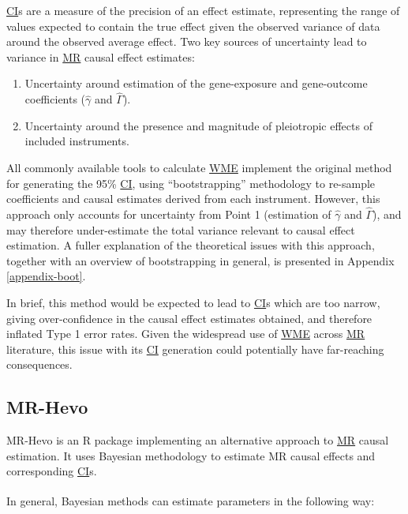 \documentclass[
]{article}
\begin{document}
\hyperref[acronyms_CI]{CI}s are a measure of the precision of an effect estimate, representing the range of values expected to contain the true effect given the observed variance of data around the observed average effect. Two key sources of uncertainty lead to variance in \hyperref[acronyms_MR]{MR} causal effect estimates:

\begin{enumerate}
\def\labelenumi{\arabic{enumi}.}
\item
  Uncertainty around estimation of the gene-exposure and gene-outcome coefficients (\(\hat{\gamma}\) and \(\hat{\Gamma}\)).
\item
  Uncertainty around the presence and magnitude of pleiotropic effects of included instruments.
\end{enumerate}

All commonly available tools to calculate \hyperref[acronyms_WME]{WME} implement the original method for generating the 95\% \hyperref[acronyms_CI]{CI}, using ``bootstrapping'' methodology to re-sample coefficients and causal estimates derived from each instrument. However, this approach only accounts for uncertainty from Point 1 (estimation of \(\hat{\gamma}\) and \(\hat{\Gamma}\)), and may therefore under-estimate the total variance relevant to causal effect estimation. A fuller explanation of the theoretical issues with this approach, together with an overview of bootstrapping in general, is presented in Appendix \ref{appendix-boot}.

In brief, this method would be expected to lead to \hyperref[acronyms_CI]{CI}s which are too narrow, giving over-confidence in the causal effect estimates obtained, and therefore inflated Type 1 error rates. Given the widespread use of \hyperref[acronyms_WME]{WME} across \hyperref[acronyms_MR]{MR} literature, this issue with its \hyperref[acronyms_CI]{CI} generation could potentially have far-reaching consequences.

\subsection{MR-Hevo}\label{mr-hevo}

MR-Hevo is an R package implementing an alternative approach to \hyperref[acronyms_MR]{MR} causal estimation. It uses Bayesian methodology to estimate MR causal effects and corresponding \hyperref[acronyms_CI]{CI}s.

In general, Bayesian methods can estimate parameters in the following way\textsuperscript{}:
\end{document}
